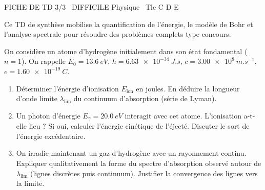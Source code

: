 \documentclass[11pt]{article}
\begin{document}
\begin{tcolorbox}[enhanced,colback=popink,colframe=popink,arc=10pt,boxrule=0pt,left=12pt,right=12pt,top=9pt,bottom=9pt]
{\color{white}\popxbold\small FICHE DE TD 3/3 \textbullet\ DIFFICILE \hfill Physique \textbullet\ Tle C D E\par}
\end{tcolorbox}
\vspace{4pt}
Ce TD de synthèse mobilise la quantification de l'énergie, le modèle de Bohr et l'analyse spectrale pour résoudre des problèmes complets type concours.

\begin{exercice}
On considère un atome d'hydrogène initialement dans son état fondamental ($n=1$). On rappelle $E_0 = \SI{13,6}{eV}$, $h = \SI{6,63e-34}{J.s}$, $c = \SI{3,00e8}{m.s^{-1}}$, $e = \SI{1,60e-19}{C}$.
\begin{enumerate}
    \item Déterminer l'énergie d'ionisation $E_{\text{ion}}$ en joules. En déduire la longueur d'onde limite $\lambda_{\text{lim}}$ du continuum d'absorption (série de Lyman).
    \item Un photon d'énergie $E_{\gamma} = \SI{20,0}{eV}$ interagit avec cet atome. L'ionisation a-t-elle lieu ? Si oui, calculer l'énergie cinétique de l'éjecté. Discuter le sort de l'énergie excédentaire.
    \item On irradie maintenant un gaz d'hydrogène avec un rayonnement continu. Expliquer qualitativement la forme du spectre d'absorption observé autour de $\lambda_{\text{lim}}$ (lignes discrètes puis continuum). Justifier la convergence des lignes vers la limite.
\end{enumerate}
\end{exercice}
\end{document}
